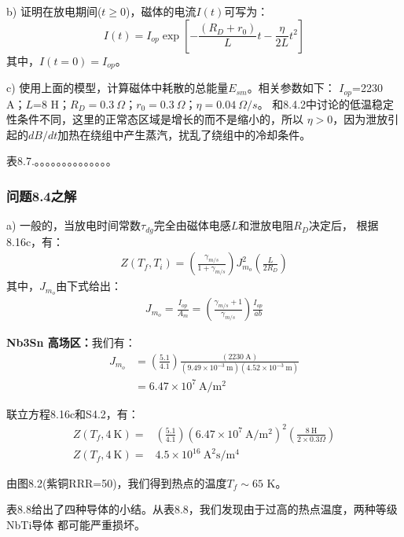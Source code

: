 b) 证明在放电期间($t\ge 0$)，磁体的电流$I(t)$可写为：
\begin{equation}%
I(t)=I_{op}\exp\left[-\frac{(R_D+r_0)}{L}t-\frac{\eta}{2L}t^2\right]
\end{equation}
其中，$I(t=0)=I_{op}$。

c) 使用上面的模型，计算磁体中耗散的总能量$E_{sm}$。相关参数如下：
$I_{op}$=2230 A；$L$=8 H；$R_D=0.3\ \Omega$；$r_0=0.3\ \Omega$；$\eta=0.04\ \Omega/s$。
和8.4.2中讨论的低温稳定性条件不同，这里的正常态区域是增长的而不是缩小的，所以
$\eta>0$，因为泄放引起的$dB/dt$加热在绕组中产生蒸汽，扰乱了绕组中的冷却条件。

表8.7.。。。。。。。。。。。。。。


\subsubsection{问题8.4之解}
a) 一般的，当放电时间常数$\tau_{dg}$完全由磁体电感$L$和泄放电阻$R_D$决定后，
根据8.16c，有：
\begin{align*}%
Z(T_f,T_i)=\left(\frac{\gamma_{m/s}}{1+\gamma_{m/s}}\right)J_{m_o}^{2}\left(\frac{L}{2R_D}\right)\tag{8.16c}
\end{align*}
其中，$J_{m_o}$由下式给出：
\begin{align*}%
J_{m_o}=\frac{I_{op}}{A_m}=\left(\frac{\gamma_{m/s}+1}{\gamma_{m/s}}\right)\frac{I_{op}}{ab}
\end{align*}

\textbf{Nb3Sn 高场区：}\quad 我们有： 
\begin{align*}%
J_{m_o}&=\left(\frac{5.1}{4.1}\right)\frac{(2230\ \mathrm{A})}{(9.49\times 10^{-3}\ \mathrm{m})(4.52\times 10^{-3}\ \mathrm{m})} \\
&=6.47\times 10^7\ \mathrm{A/m^2} \tag{S4.1}
\end{align*}

联立方程8.16c和S4.2，有：
\begin{align*}%
Z(T_f,4\ \mathrm{K})=&\left(\frac{5.1}{4.1}\right)(6.47\times 10^7\ \mathrm{A/m^2})^2\left(\frac{8\ \mathrm{H}}{2\times 0.3\Omega}\right)\\
Z(T_f,4\ \mathrm{K})=&4.5\times 10^{16}\ \mathrm{A^2s/m^4}
\end{align*}

由图8.2(紫铜RRR=50)，我们得到热点的温度$T_f\sim 65$ K。

表8.8给出了四种导体的小结。从表8.8，我们发现由于过高的热点温度，两种等级NbTi导体
都可能严重损坏。

